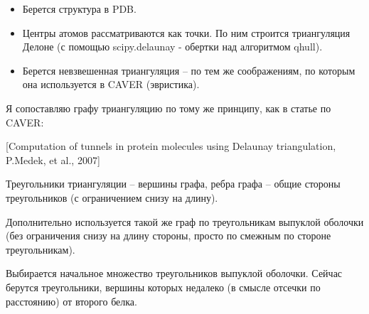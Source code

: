 \begin{itemize}
\item Берется структура в PDB.
\item Центры атомов рассматриваются как точки. По ним строится триангуляция Делоне (с помощью scipy.delaunay - обертки над алгоритмом qhull).
\item Берется невзвешенная триангуляция -- по тем же соображениям, по которым она используется в CAVER (эвристика).
\end{itemize}
Я сопоставляю графу триангуляцию по тому же принципу, как в статье по CAVER:

\begin{center}

[Computation of tunnels in protein molecules using
Delaunay triangulation, P.Medek, et al., 2007]
\end{center}

Треугольники триангуляции -- вершины графа, ребра графа -- общие стороны треугольников (с ограничением снизу на длину).

Дополнительно используется такой же граф по треугольникам выпуклой оболочки (без ограничения снизу на длину стороны, просто по смежным по стороне треугольникам).

Выбирается начальное множество треугольников выпуклой оболочки. Сейчас берутся треугольники, вершины которых недалеко (в смысле отсечки по расстоянию) от второго белка.

